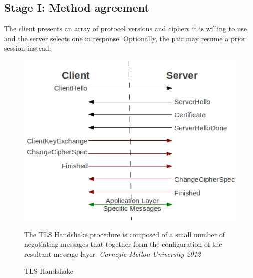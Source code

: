 \documentclass[12pt]{article}
\begin{document}
\subsection{Stage I: Method agreement}

The client presents an array of protocol versions and ciphers it is willing to use, and the server selects one in response. Optionally, the pair may resume a prior session instead.

\begin{figure}[ht]
    \hspace{0.75cm}
    \begin{minipage}[c]{0.53\textwidth}
        \includegraphics[width=\textwidth]{tls_protocol.png}
    \end{minipage}
    \begin{minipage}[c]{0.3\textwidth}
        \caption{TLS Handshake}%
        \label{Handshake}%
        \sffamily\footnotesize The TLS Handshake procedure is composed of a small number of negotiating messages that together form the configuration of the resultant message layer.
        \scriptsize\textcopyright\rmfamily\textit{Carnegie Mellon University 2012}
    \end{minipage}
\end{figure}
\end{document}
